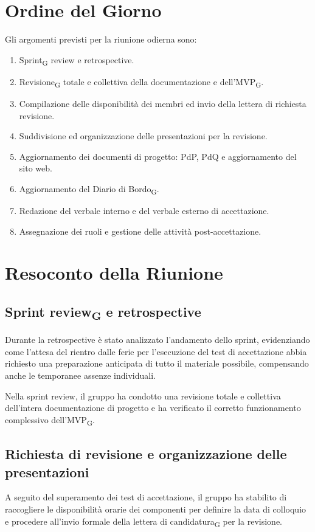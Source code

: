 \section{Ordine del Giorno}

Gli argomenti previsti per la riunione odierna sono:

\begin{enumerate}
\item Sprint\textsubscript{G} review e retrospective.
\item Revisione\textsubscript{G} totale e collettiva della documentazione e dell'MVP\textsubscript{G}.
\item Compilazione delle disponibilità dei membri ed invio della lettera di richiesta revisione.
\item Suddivisione ed organizzazione delle presentazioni per la revisione.
\item Aggiornamento dei documenti di progetto: PdP, PdQ e aggiornamento del sito web.
\item Aggiornamento del Diario di Bordo\textsubscript{G}.
\item Redazione del verbale interno e del verbale esterno di accettazione.
\item Assegnazione dei ruoli e gestione delle attività post-accettazione.
\end{enumerate}


\section{Resoconto della Riunione}

\subsection{Sprint review\textsubscript{G} e retrospective}
Durante la retrospective è stato analizzato l'andamento dello sprint, evidenziando come l'attesa del rientro dalle ferie per l'esecuzione del test di accettazione abbia richiesto una preparazione anticipata di tutto il materiale possibile, compensando anche le temporanee assenze individuali.

Nella sprint review, il gruppo ha condotto una revisione totale e collettiva dell'intera documentazione di progetto e ha verificato il corretto funzionamento complessivo dell'MVP\textsubscript{G}.

\subsection{Richiesta di revisione e organizzazione delle presentazioni}
A seguito del superamento dei test di accettazione, il gruppo ha stabilito di raccogliere le disponibilità orarie dei componenti per definire la data di colloquio e procedere all'invio formale della lettera di candidatura\textsubscript{G} per la revisione.

